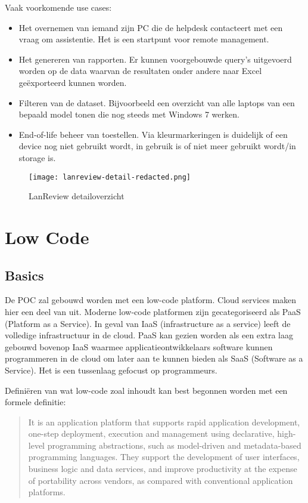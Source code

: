 Vaak voorkomende use cases:
\begin{itemize}
    \item Het overnemen van iemand zijn PC die de helpdesk contacteert met een vraag om assistentie. Het is een startpunt voor remote management.
    \item Het genereren van rapporten. Er kunnen voorgebouwde query's uitgevoerd worden op de data waarvan de resultaten onder andere naar Excel geëxporteerd kunnen worden.
    \item Filteren van de dataset. Bijvoorbeeld een overzicht van alle laptops van een bepaald model tonen die nog steeds met Windows 7 werken.
    \item End-of-life beheer van toestellen. Via kleurmarkeringen is duidelijk of een device nog niet gebruikt wordt, in gebruik is of niet meer gebruikt wordt/in storage is.
\end{itemize}


\begin{figure}[h!]
    \texttt{[image: lanreview-detail-redacted.png]}
    \caption{LanReview detailoverzicht}
    \label{fig:lr-detail}
\end{figure}

\section{Low Code}

\subsection{Basics}

De POC zal gebouwd worden met een low-code platform. Cloud services maken hier een deel van uit. Moderne low-code platformen zijn gecategoriseerd als PaaS (Platform as a Service). In geval van IaaS (infrastructure as a service) leeft de volledige infrastructuur in de cloud. PaaS kan gezien worden als een extra laag gebouwd bovenop IaaS waarmee applicatieontwikkelaars software kunnen programmeren in de cloud om later aan te kunnen bieden als SaaS (Software as a Service). Het is een tussenlaag gefocust op programmeurs. \autocite{Nucleus2017}

Definiëren van wat low-code zoal inhoudt kan best begonnen worden met een formele definitie:
\begin{quote}
    It is an application platform that supports rapid application development, one-step deployment, execution and management using declarative, high-level programming abstractions, such as model-driven and metadata-based programming languages. They support the development of user interfaces, business logic and data services, and improve productivity at the expense of portability across vendors, as compared with conventional application platforms.\\ \autocite{Vincent2019}
\end{quote}

